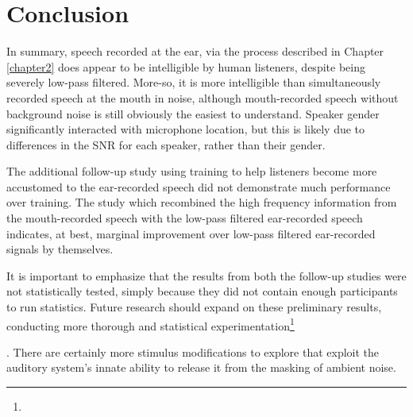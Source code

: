 \section{Conclusion}

In summary, speech recorded at the ear, via the process described in Chapter \ref{chapter2} does appear to be intelligible by human listeners, despite being severely low-pass filtered.  More-so, it is more intelligible than simultaneously recorded speech at the mouth in noise, although mouth-recorded speech without background noise is still obviously the easiest to understand.  Speaker gender significantly interacted with microphone location, but this is likely due to differences in the SNR for each speaker, rather than their gender.  

The additional follow-up study using training to help listeners become more accustomed to the ear-recorded speech did not demonstrate much performance over training.  The study which recombined the high frequency information from the mouth-recorded speech with the low-pass filtered ear-recorded speech indicates, at best, marginal improvement over low-pass filtered ear-recorded signals by themselves.

It is important to emphasize that the results from both the follow-up studies were not statistically tested, simply because they did not contain enough participants to run statistics.  Future research should expand on these preliminary results, conducting more thorough and statistical experimentation\DIFdelbegin \footnote{}%
\addtocounter{footnote}{-1}%
\DIFdelend .  There are certainly more stimulus modifications to explore that exploit the auditory system's innate ability to release it from the masking of ambient noise.

